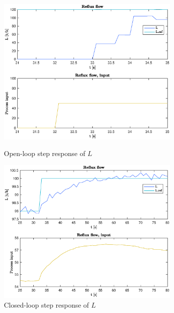 \documentclass[12pt]{article}
\begin{document}
\begin{figure}[p]
\centering
\includegraphics[width=0.8\textwidth]{../Systemanalyse/Log_Data_to_Matlab/Figurer/Stegeksperimenter/FC1015.eps}
\caption{Open-loop step response of $L$}
\label{fig:ol_step_FC1015}

\includegraphics[width=0.8\textwidth]{../Systemanalyse/Log_Data_to_Matlab/Figurer/Stegeksperimenter/FC1015_step.eps}
\caption{Closed-loop step response of $L$}
\label{fig:cl_step_FC1015}
\end{figure}
\end{document}
